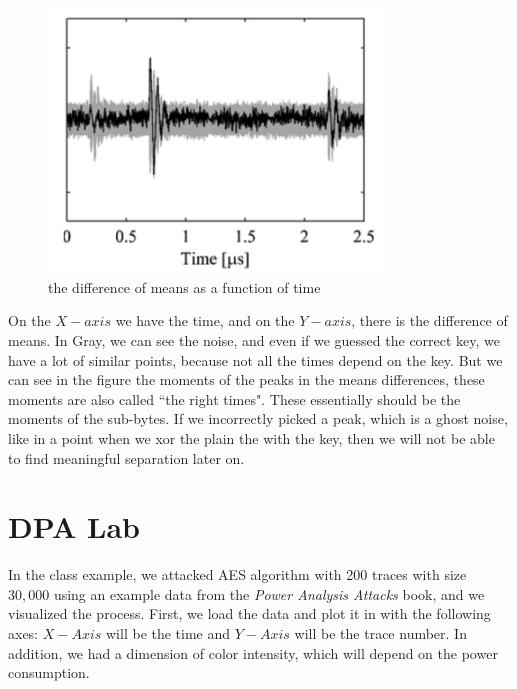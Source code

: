 \begin{figure}[!ht]
    \centering
    \includegraphics[width=0.8\textwidth]{images/Lecture6/meansDiffFigure.png}
    \caption{the difference of means as a function of time}
    \label{fig:meansDiffFigure}
\end{figure}

On the $X-axis$ we have the time, and on the $Y-axis$, there is the difference of means. 
In Gray, we can see the noise, and even if we guessed the correct key, we have a lot of similar points, because not all the times depend on the key. 
But we can see in the figure the moments of the peaks in the means
differences, these moments are also called ``the right times".
These essentially should be the moments of the sub-bytes. 
If we incorrectly picked a peak, which is a ghost noise, like in a point when we xor the plain the with the key, then we will not be able to find meaningful separation later on.

\section{DPA Lab}
In the class example, we attacked AES algorithm with 200 traces with size $30,000$ using an example data from the \textit{Power Analysis Attacks} book, and we visualized the process. 
First, we load the data and plot it in  with the following axes: $X-Axis$ will be the time and $Y-Axis$ will be the trace number.
In addition, we had a dimension of color intensity, which will depend on the power consumption.

